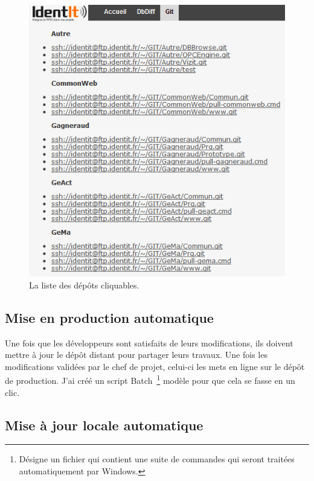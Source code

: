 \begin{figure}
    \begin{center}
        \includegraphics[scale=0.8]{images/repo.png}
        \caption{La liste des dépôts cliquables.}
        \label{repo}
    \end{center}
\end{figure}

\newpage

\subsection{Mise en production automatique} %
\label{sub:Mise en production automatique}

Une fois que les développeurs sont satisfaits de leurs modifications,
ils doivent mettre à jour le dépôt distant pour partager leurs travaux.
Une fois les modifications validées par le chef de projet, celui-ci les
mets en ligne sur le dépôt de production. J'ai créé un script Batch\,
\footnote{Désigne un fichier qui contient une suite de commandes qui
seront traitées automatiquement par Windows.} \og modèle \fg{} pour que
cela se fasse en un clic.

\subsection{Mise à jour locale automatique} %
\label{sub:Mise à jour locale automatique}


